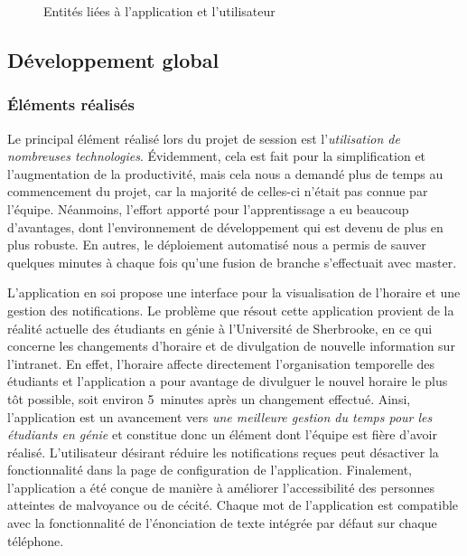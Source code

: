    \begin{figure}[p] \centering
        
        \caption{Entités liées à l'application et l'utilisateur}
        \label{fig.persistance}
    \end{figure}
    
    
    \pagebreak
    \subsection{Développement global}
        \subsubsection{Éléments réalisés}
        Le principal élément réalisé lors du projet de session est l'\emph{utilisation de nombreuses technologies}. Évidemment, cela est fait pour la simplification et l'augmentation de la productivité, mais cela nous a demandé plus de temps au commencement du projet, car la majorité de celles-ci n'était pas connue par l'équipe. Néanmoins, l'effort apporté pour l'apprentissage a eu beaucoup d'avantages, dont l'environnement de développement qui est devenu de plus en plus robuste. En autres, le déploiement automatisé nous a permis de sauver quelques minutes à chaque fois qu'une fusion de branche s'effectuait avec \og master\fg{}.
    
        L'application en soi propose une interface pour la visualisation de l'horaire et une gestion des notifications. Le problème que résout cette application provient de la réalité actuelle des étudiants en génie à l'Université de Sherbrooke, en ce qui concerne les changements d'horaire et de divulgation de nouvelle information sur l'intranet. En effet, l'horaire affecte directement l'organisation temporelle des étudiants et l'application a pour avantage de divulguer le nouvel horaire le plus tôt possible, soit environ 5~minutes après un changement effectué. Ainsi, l'application est un avancement vers \emph{une meilleure gestion du temps pour les étudiants en génie} et constitue donc un élément dont l'équipe est fière d'avoir réalisé. L'utilisateur désirant réduire les notifications reçues peut désactiver la fonctionnalité dans la page de configuration de l'application. Finalement, l'application a été conçue de manière à améliorer l'accessibilité des personnes atteintes de malvoyance ou de cécité. Chaque mot de l'application est compatible avec la fonctionnalité de l'énonciation de texte intégrée par défaut sur chaque téléphone.

